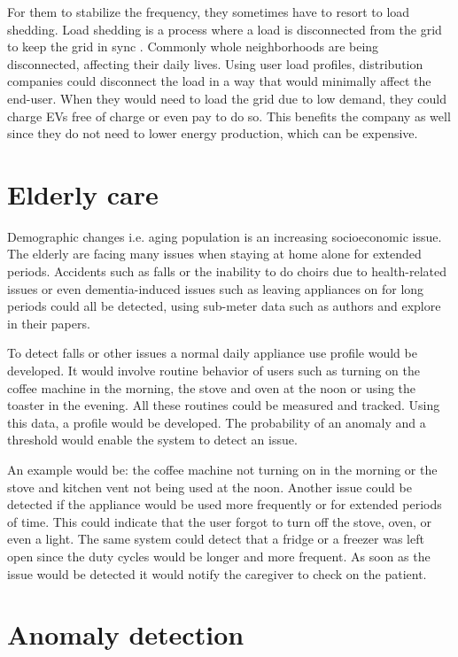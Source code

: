 For them to stabilize the frequency, they sometimes have to resort to load shedding.
Load shedding is a process where a load is disconnected from the grid to keep the grid in sync \cite{loadShedding2006}.
Commonly whole neighborhoods are being disconnected, affecting their daily lives.
Using user load profiles, distribution companies could disconnect the load in a way that would minimally affect the end-user. 
When they would need to load the grid due to low demand, they could charge EVs free of charge or even pay to do so. 
This benefits the company as well since they do not need to lower energy production, which can be expensive. 

\section{Elderly care}

Demographic changes i.e. aging population is an increasing socioeconomic issue.
The elderly are facing many issues when staying at home alone for extended periods.
Accidents such as falls or the inability to do choirs due to health-related issues or even dementia-induced issues 
such as leaving appliances on for long periods could all be detected, using sub-meter data such as authors \cite{elder1} and \cite{elder2}
explore in their papers.

To detect falls or other issues a normal daily appliance use profile would be developed.
It would involve routine behavior of users such as turning on the coffee machine in the morning, the stove and oven at the noon or using the toaster in the evening.
All these routines could be measured and tracked. Using this data, a profile would be developed.
The probability of an anomaly and a threshold would enable the system to detect an issue.

An example would be: the coffee machine not turning on in the morning or the stove and kitchen vent not being used at the noon.
Another issue could be detected if the appliance would be used more frequently or for extended periods of time. 
This could indicate that the user forgot to turn off the stove, oven, or even a light. The same system could detect 
that a fridge or a freezer was left open since the duty cycles would be longer and more frequent. 
As soon as the issue would be detected it would notify the caregiver to check on the patient.

\section{Anomaly detection}


